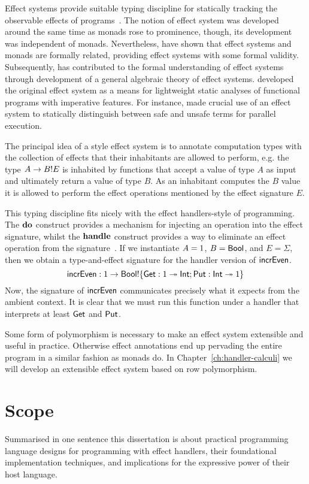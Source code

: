 \documentclass[12pt,phd,lfcs,twoside,openright,logo,leftchapter,normalheadings]{infthesis}
\theoremstyle{plain}
\theoremstyle{definition}
\begin{document}
Effect systems provide suitable typing discipline for statically
tracking the observable effects of programs~\cite{NielsonN99}. The
notion of effect system was developed around the same time as monads
rose to prominence, though, its development was independent of
monads. Nevertheless, \citet{WadlerT03} have shown that effect systems
and monads are formally related, providing effect systems with some
formal validity. Subsequently, \citet{Kammar14} has contributed to the
formal understanding of effect systems through development of a
general algebraic theory of effect systems. \citet{LucassenG88}
developed the original effect system as a means for lightweight static
analyses of functional programs with imperative features. For
instance, \citet{Lucassen87} made crucial use of an effect system to
statically distinguish between safe and unsafe terms for parallel
execution.

The principal idea of a \citeauthor{LucassenG88} style effect system is to
annotate computation types with the collection of effects that their
inhabitants are allowed to perform, e.g. the type $A \to B ! E$ is
inhabited by functions that accept a value of type $A$ as input and
ultimately return a value of type $B$. As an inhabitant computes the
$B$ value it is allowed to perform the effect operations mentioned by
the effect signature $E$.

This typing discipline fits nicely with the effect handlers-style of
programming. The $\mathbf{do}$ construct provides a mechanism for injecting an
operation into the effect signature, whilst the $\mathbf{handle}$ construct
provides a way to eliminate an effect operation from the
signature~\cite{BauerP13,HillerstromL16}.
%
If we instantiate $A = 1$, $B = \mathsf{Bool}$, and $E = \Sigma$, then
we obtain a type-and-effect signature for the handler version of
$\mathsf{incrEven}$.
%
\[
  \mathsf{incrEven} : 1 \to \mathsf{Bool} ! \{\mathsf{Get}:1 \twoheadrightarrow \mathsf{Int};\mathsf{Put}:\mathsf{Int} \twoheadrightarrow 1\}
\]
%
Now, the signature of $\mathsf{incrEven}$ communicates precisely what it
expects from the ambient context. It is clear that we must run this
function under a handler that interprets at least $\mathsf{Get}$ and $\mathsf{Put}$.

Some form of polymorphism is necessary to make an effect system
extensible and useful in practice. Otherwise effect annotations end up
pervading the entire program in a similar fashion as monads do. In
Chapter~\ref{ch:handler-calculi} we will develop an extensible effect
system based on row polymorphism.

\section{Scope}
Summarised in one sentence this dissertation is about practical
programming language designs for programming with effect handlers,
their foundational implementation techniques, and implications for the
expressive power of their host language.
\end{document}
